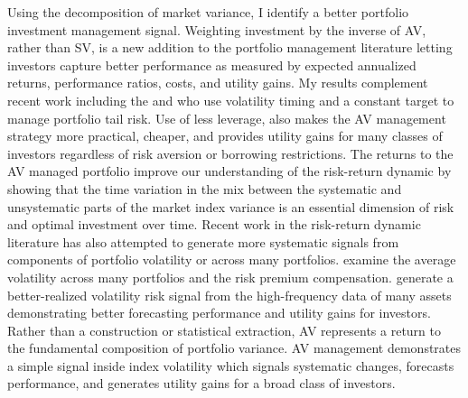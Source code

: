 Using the decomposition of market variance, I identify a better portfolio investment management signal. Weighting investment by the inverse of AV, rather than SV, is a new addition to the portfolio management literature letting investors capture better performance as measured by expected annualized returns,  performance ratios, costs, and utility gains. My results complement recent work including the \citet{moreira_volatility-managed_2017} and \citet{hocquard_constant-volatility_2013} who use volatility timing and a constant target to manage portfolio tail risk. Use of less leverage, also makes the AV management strategy more practical, cheaper, and provides utility gains for many classes of investors regardless of risk aversion or borrowing restrictions. The returns to the AV managed portfolio improve our understanding of the risk-return dynamic by showing that the time variation in the mix between the systematic and unsystematic parts of the market index variance is an essential dimension of risk and optimal investment over time.  Recent work in the risk-return dynamic literature has also attempted to generate more systematic signals from components of portfolio volatility or across many portfolios. \citet{gonzalez-urteaga_cross-sectional_2016} examine the average volatility across many portfolios and the risk premium compensation. \citet{bollerslev_risk_2017} generate a better-realized volatility risk signal from the high-frequency data of many assets demonstrating better forecasting performance and utility gains for investors. Rather than a construction or statistical extraction, AV represents a return to the fundamental composition of portfolio variance. AV management demonstrates a simple signal inside index volatility which signals systematic changes, forecasts performance, and generates utility gains for a broad class of investors.